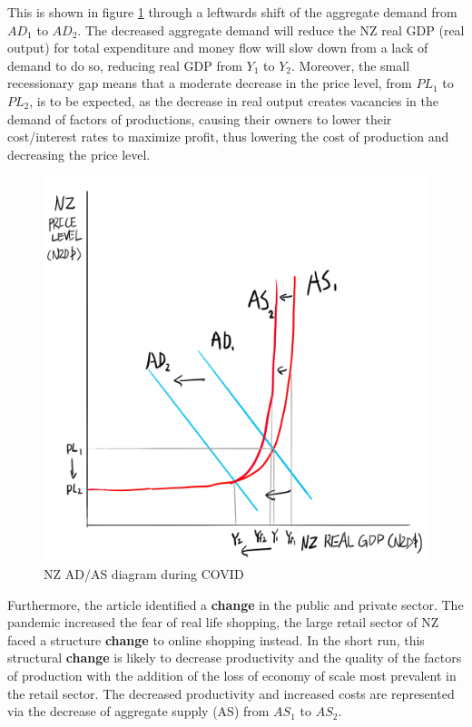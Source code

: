 \documentclass[a4paper,12pt]{article}
\begin{document}
This is shown in figure \ref{fig:asad} through a leftwards shift of the aggregate demand from $AD_1$ to $AD_2$. The decreased aggregate demand will reduce the NZ real GDP (real output) for total expenditure and money flow will slow down from a lack of demand to do so, reducing real GDP from $Y_1$ to $Y_2$. Moreover, the small recessionary gap means that a moderate decrease in the price level, from $PL_1$ to $PL_2$, is to be expected, as the decrease in real output creates vacancies in the demand of factors of productions, causing their owners to lower their cost/interest rates to maximize profit, thus lowering the cost of production and decreasing the price level.

\begin{figure}[H]
    \centering
    \includegraphics[scale=0.6]{assets/asad.png}
    \caption{NZ AD/AS diagram during COVID}
    \label{fig:asad}
\end{figure}

Furthermore, the article identified a \textbf{change} in the public and private sector. The pandemic increased the fear of real life shopping, the large retail sector of NZ faced a structure \textbf{change} to online shopping instead. In the short run, this structural \textbf{change} is likely to decrease productivity and the quality of the factors of production
with the addition of the loss of economy of scale most prevalent in the retail sector. The decreased productivity and increased costs are represented via the decrease of aggregate supply (AS) from $AS_1$ to $AS_2$.
\end{document}
